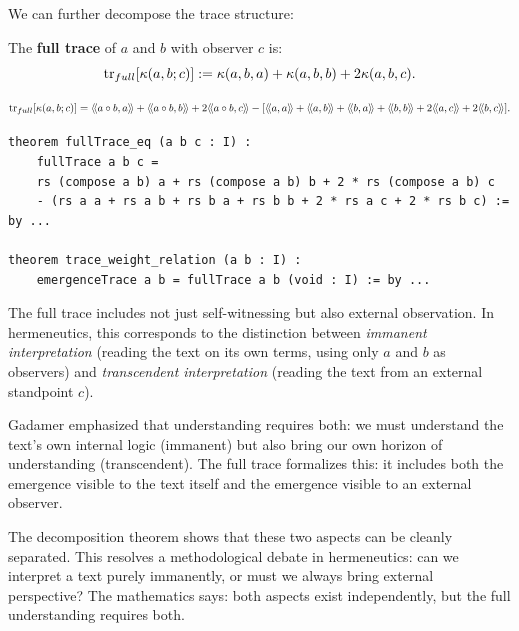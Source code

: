 We can further decompose the trace structure:

\begin{definition}
\label{def:full-trace}
The \textbf{full trace} of $a$ and $b$ with observer $c$ is:
\[
  \mathrm{tr}_{full}[\kappa(a,b;c)] := \kappa(a,b,a) + \kappa(a,b,b) + 2\kappa(a,b,c).
\]
\end{definition}

\begin{theorem}
\label{thm:trace-weight-relation}
\[
  \mathrm{tr}_{full}[\emerge(a,b;c)] =
  \rs{a \compose b}{a} + \rs{a \compose b}{b} + 2\rs{a \compose b}{c}
  - [\rs{a}{a} + \rs{a}{b} + \rs{b}{a} + \rs{b}{b} + 2\rs{a}{c} + 2\rs{b}{c}].
\]
\end{theorem}

\begin{lstlisting}[caption={Full trace structure (IDT\_v3\_Emergence.lean)}]
theorem fullTrace_eq (a b c : I) :
    fullTrace a b c =
    rs (compose a b) a + rs (compose a b) b + 2 * rs (compose a b) c
    - (rs a a + rs a b + rs b a + rs b b + 2 * rs a c + 2 * rs b c) := by ...
    
theorem trace_weight_relation (a b : I) :
    emergenceTrace a b = fullTrace a b (void : I) := by ...
\end{lstlisting}

\begin{interpretation}
The full trace includes not just self-witnessing but also external observation.
In hermeneutics, this corresponds to the distinction between \emph{immanent
interpretation} (reading the text on its own terms, using only $a$ and $b$ as
observers) and \emph{transcendent interpretation} (reading the text from an
external standpoint $c$).

Gadamer emphasized that understanding requires both: we must understand the
text's own internal logic (immanent) but also bring our own horizon of
understanding (transcendent). The full trace formalizes this: it includes both
the emergence visible to the text itself and the emergence visible to an
external observer.

The decomposition theorem shows that these two aspects can be cleanly separated.
This resolves a methodological debate in hermeneutics: can we interpret a text
purely immanently, or must we always bring external perspective? The mathematics
says: both aspects exist independently, but the full understanding requires both.
\end{interpretation}


